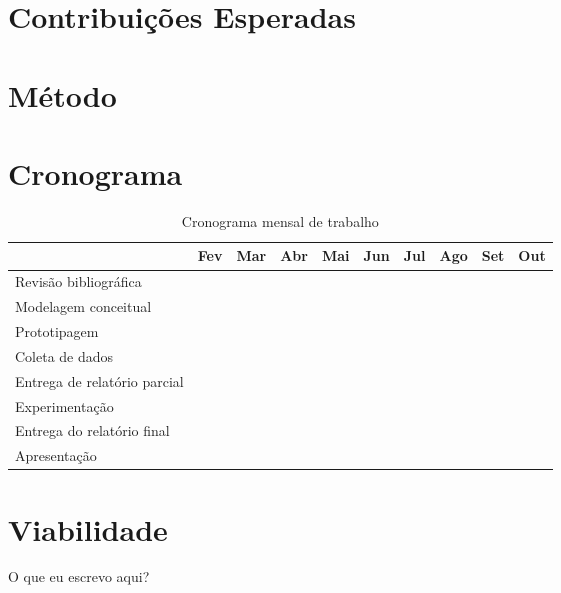 \documentclass[pfc]{imetex}
\begin{document}
\section{Contribuições Esperadas}

\section{Método}

\section{Cronograma}

\begin{table}[htb]
\begin{tabular}{|l|c|c|c|c|c|c|c|c|c|}
\hline
& Fev & Mar & Abr & Mai & Jun & Jul & Ago & Set & Out \\
\hline
Revisão bibliográfica &
\multicolumn{2}{c}{\cellcolor[gray]{0.5}} &
\multicolumn{6}{c}{} &
\\
\hline
Modelagem conceitual &
\multicolumn{1}{c}{} &
\multicolumn{3}{c}{\cellcolor[gray]{0.5}} &
\multicolumn{4}{c}{} &
\\
\hline
Prototipagem &
\multicolumn{2}{c}{} &
\multicolumn{3}{c}{\cellcolor[gray]{0.5}} &
\multicolumn{3}{c}{} &
\\
\hline
Coleta de dados &
\multicolumn{4}{c}{} &
\multicolumn{1}{c}{\cellcolor[gray]{0.5}} &
\multicolumn{3}{c}{} &
\\
\hline
Entrega de relatório parcial &
\multicolumn{3}{c}{} &
\multicolumn{1}{c}{\cellcolor[gray]{0.5}} &
\multicolumn{1}{c}{} &
\multicolumn{1}{c}{\cellcolor[gray]{0.5}} &
\multicolumn{2}{c}{} &
\\
\hline
Experimentação &
\multicolumn{5}{c}{} &
\multicolumn{2}{c}{\cellcolor[gray]{0.5}} &
\multicolumn{1}{c}{} &
\\
\hline
Entrega do relatório final &
\multicolumn{7}{c}{} &
\multicolumn{1}{c}{\cellcolor[gray]{0.5}} &
\\
\hline
Apresentação &
\multicolumn{8}{c}{} &
\multicolumn{1}{c}{\cellcolor[gray]{0.5}}
\\
\hline
\end{tabular}

\caption{Cronograma mensal de trabalho}
\end{table}

\section{Viabilidade}
O que eu escrevo aqui?
\end{document}

